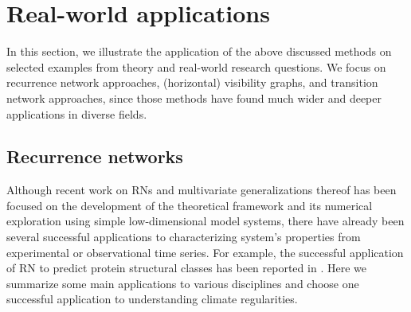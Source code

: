 \section{Real-world applications}\label{sec:Applications}
In this section, we illustrate the application of the above discussed methods on selected  examples from theory and real-world research questions. We focus on recurrence network approaches, (horizontal) visibility graphs, and transition network approaches, since those methods have found much wider and deeper applications in diverse fields.

	\subsection{Recurrence networks}
		Although recent work on RNs and multivariate generalizations thereof has been focused on the development of the theoretical framework and its numerical exploration using simple low-dimensional model systems, there have already been several successful applications to characterizing system's properties from experimental or observational time series. For example, the successful application of RN to predict protein structural classes has been reported in \cite{Olyaee2016}. Here we summarize some main applications to various disciplines and choose one successful application to understanding climate regularities.


